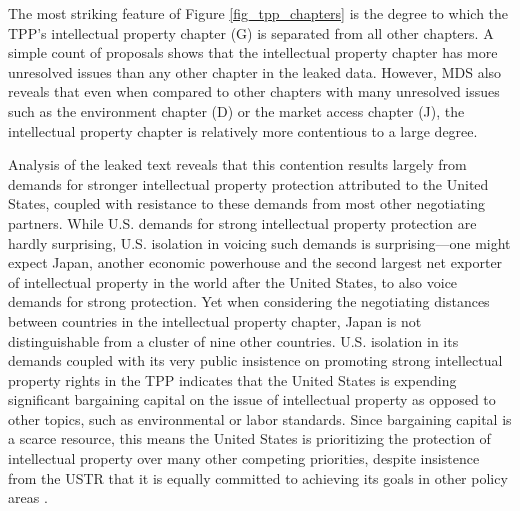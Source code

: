 \documentclass[12pt]{article}
\begin{document}
The most striking feature of Figure \ref{fig_tpp_chapters} is the degree to which the TPP's 
intellectual property chapter (G) 
is separated from all other chapters. A simple count of proposals shows that the intellectual property 
chapter has more unresolved issues than any other chapter in the leaked data. However, MDS 
also reveals that even when compared to other chapters with many unresolved 
issues such as the environment chapter (D) or the market access chapter (J), the intellectual property chapter 
is relatively more contentious to a large degree.

Analysis of the leaked text reveals that this contention results largely from demands for stronger intellectual 
property protection attributed to the United States, 
coupled with resistance to these demands from most other negotiating partners. While U.S. demands for 
strong intellectual property protection are hardly surprising, U.S. isolation in voicing such demands 
is surprising---one might expect Japan, another economic powerhouse and the second largest net exporter of 
intellectual property in the world after the United States, to also voice demands for strong protection. Yet when 
considering the negotiating distances between countries in the intellectual property chapter, Japan 
is not distinguishable from a cluster of nine other countries. U.S. isolation in its demands coupled with 
its very public insistence on promoting strong intellectual property rights in the TPP indicates that the 
United States is expending significant bargaining capital on the issue of intellectual property as opposed to 
other topics, such as environmental or labor standards. Since bargaining capital is a scarce resource, this 
means the United States is prioritizing the protection of intellectual property over many other competing priorities, 
despite insistence from the USTR that it is equally committed to 
achieving its goals in other policy areas \citep{u.s._trade_representative????trans-pacific}. 
\end{document}

